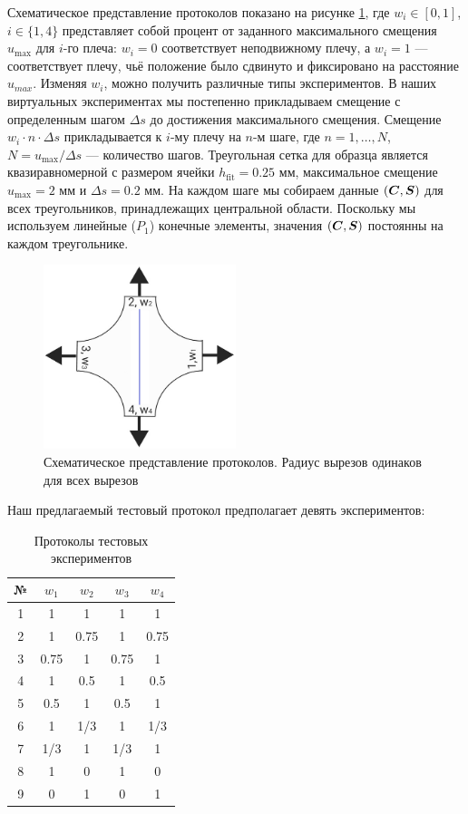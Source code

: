 Схематическое представление протоколов показано на рисунке \ref{fig:malt_displacements}, где $w_i \in [0,1]$, $i \in \{1,4\}$
представляет собой процент от заданного максимального смещения $u_{\max}$ для $i$-го плеча: $w_i = 0$ 
соответствует неподвижному плечу, а $w_i = 1$ — соответствует плечу, чьё положение было сдвинуто и фиксировано на расстояние $u_{max}$. 
Изменяя $w_i$, можно получить различные типы экспериментов. 
В наших виртуальных экспериментах мы постепенно 
прикладываем смещение с определенным шагом $\Delta s$ до достижения максимального смещения. 
Смещение $w_i \cdot n \cdot \Delta s$ прикладывается к $i$-му плечу на $n$-м шаге, где $n = 1, \ldots, N$, 
$N = u_{\max}/\Delta s$ — количество шагов. 
Треугольная сетка для образца является квазиравномерной с размером ячейки $h_{\text{fit}} = 0.25$ мм, максимальное смещение 
$u_{\max} = 2$ мм и $\Delta s = 0.2$ мм. 
На каждом шаге мы собираем данные $(\boldsymbol{C}, \boldsymbol{S})$ для всех треугольников, принадлежащих центральной области. 
Поскольку мы используем линейные ($P_1$) конечные элементы, значения $(\boldsymbol{C}, \boldsymbol{S})$ постоянны на каждом треугольнике.

 \begin{figure}[H]
  \centering
  \includegraphics[width=0.5\textwidth]{img/malt_dirichlet.png}
  \caption{Схематическое представление протоколов. 
  Радиус вырезов одинаков для всех вырезов}
  \label{fig:malt_displacements}
\end{figure}
 
Наш предлагаемый тестовый протокол предполагает девять экспериментов:

\begin{table}[H]
\centering
\caption{Протоколы тестовых экспериментов}
\label{tab:test_protocols}
\begin{tabular}{|c|c|c|c|c|}
\hline
\textbf{№} & $w_1$ & $w_2$ & $w_3$ & $w_4$ \\
\hline
1 & 1 & 1 & 1 & 1 \\
2 & 1 & 0.75 & 1 & 0.75 \\
3 & 0.75 & 1 & 0.75 & 1 \\
4 & 1 & 0.5 & 1 & 0.5 \\
5 & 0.5 & 1 & 0.5 & 1 \\
6 & 1 & 1/3 & 1 & 1/3 \\
7 & 1/3 & 1 & 1/3 & 1 \\
8 & 1 & 0 & 1& 0 \\
9 & 0 & 1 & 0 & 1 \\
\hline
\end{tabular}
\end{table}

